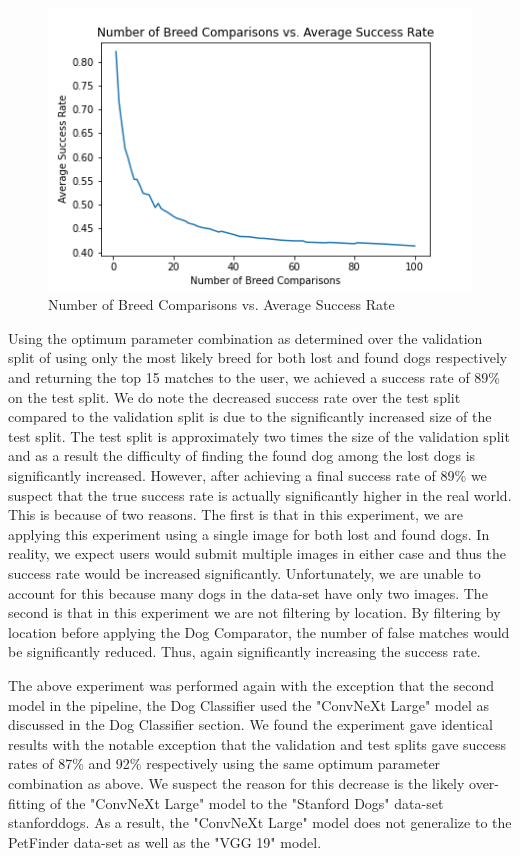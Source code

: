 \documentclass{article}
\begin{document}
\begin{figure}[]
\centering
	\includegraphics[scale=0.7]{final-report-images/num_breed_comparison_accuracy.png}
\caption{Number of Breed Comparisons vs. Average Success Rate}
\label{fig:x breed comparisons}
\end{figure}

Using the optimum parameter combination as determined over the validation split of using only the most likely breed for both lost and found dogs respectively and returning the top 15 matches to the user, we achieved a success rate of 89\% on the test split.  We do note the decreased success rate over the test split compared to the validation split is due to the significantly increased size of the test split.  The test split is approximately two times the size of the validation split and as a result the difficulty of finding the found dog among the lost dogs is significantly increased.  However, after achieving a final success rate of 89\% we suspect that the true success rate is actually significantly higher in the real world.  This is because of two reasons.  The first is that in this experiment, we are applying this experiment using a single image for both lost and found dogs.  In reality, we expect users would submit multiple images in either case and thus the success rate would be increased significantly.  Unfortunately, we are unable to account for this because many dogs in the data-set have only two images.  The second is that in this experiment we are not filtering by location.  By filtering by location before applying the Dog Comparator, the number of false matches would be significantly reduced.  Thus, again significantly increasing the success rate.

The above experiment was performed again with the exception that the second model in the pipeline, the Dog Classifier used the "ConvNeXt Large" model as discussed in the Dog Classifier section.  We found the experiment gave identical results with the notable exception that the validation and test splits gave success rates of 87\% and 92\% respectively using the same optimum parameter combination as above.  We suspect the reason for this decrease is the likely over-fitting of the "ConvNeXt Large" model to the "Stanford Dogs" data-set {stanforddogs}.  As a result, the "ConvNeXt Large" model does not generalize to the PetFinder data-set as well as the "VGG 19" model.
\end{document}
